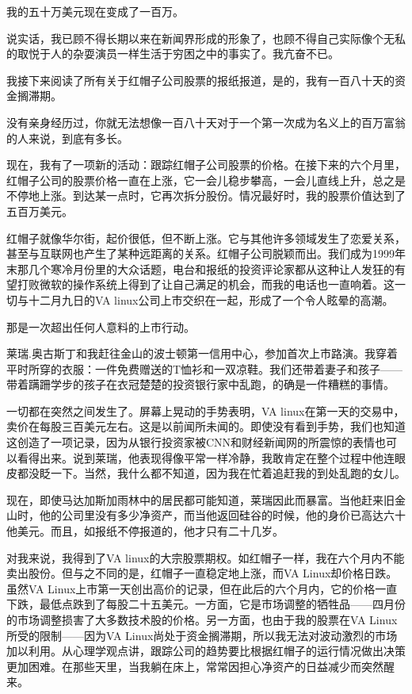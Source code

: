 我的五十万美元现在变成了一百万。

说实话，我已顾不得长期以来在新闻界形成的形象了，也顾不得自己实际像个无私的取悦于人的杂耍演员一样生活于穷困之中的事实了。我亢奋不已。

我接下来阅读了所有关于红帽子公司股票的报纸报道，是的，我有一百八十天的资金搁滞期。

没有亲身经历过，你就无法想像一百八十天对于一个第一次成为名义上的百万富翁的人来说，到底有多长。

现在，我有了一项新的活动：跟踪红帽子公司股票的价格。在接下来的六个月里，红帽子公司的股票价格一直在上涨，它一会儿稳步攀高，一会儿直线上升，总之是不停地上涨。到达某一点时，它再次拆分股份。情况最好时，我的股票价值达到了五百万美元。

红帽子就像华尔街，起价很低，但不断上涨。它与其他许多领域发生了恋爱关系，甚至与互联网也产生了某种远距离的关系。红帽子公司脱颖而出。我们成为1999年末那几个寒冷月份里的大众话题，电台和报纸的投资评论家都从这种让人发狂的有望打败微软的操作系统上得到了让自己满足的机会，而我的电话也一直响着。这一切与十二月九日的VA linux公司上市交织在一起，形成了一个令人眩晕的高潮。

那是一次超出任何人意料的上市行动。

莱瑞.奥古斯丁和我赶往金山的波士顿第一信用中心，参加首次上市路演。我穿着平时所穿的衣服：一件免费赠送的T恤衫和一双凉鞋。我们还带着妻子和孩子——带着蹒跚学步的孩子在衣冠楚楚的投资银行家中乱跑，的确是一件糟糕的事情。

一切都在突然之间发生了。屏幕上晃动的手势表明，VA linux在第一天的交易中，卖价在每股三百美元左右。这是以前闻所未闻的。即使没有看到手势，我们也知道这创造了一项记录，因为从银行投资家被CNN和财经新闻网的所震惊的表情也可以看得出来。说到莱瑞，他表现得像平常一样冷静，我敢肯定在整个过程中他连眼皮都没眨一下。当然，我什么都不知道，因为我在忙着追赶我的到处乱跑的女儿。

现在，即使马达加斯加雨林中的居民都可能知道，莱瑞因此而暴富。当他赶来旧金山时，他的公司里没有多少净资产，而当他返回硅谷的时候，他的身价已高达六十他美元。而且，如报纸不停报道的，他才只有二十几岁。

对我来说，我得到了VA linux的大宗股票期权。如红帽子一样，我在六个月内不能卖出股份。但与之不同的是，红帽子一直稳定地上涨，而VA Linux却价格日跌。虽然VA Linux上市第一天创出高价的记录，但在此后的六个月内，它的价格一直下跌，最低点跌到了每股二十五美元。一方面，它是市场调整的牺牲品——四月份的市场调整损害了大多数技术股的价格。另一方面，也由于我的股票在VA Linux所受的限制——因为VA Linux尚处于资金搁滞期，所以我无法对波动激烈的市场加以利用。从心理学观点讲，跟踪公司的趋势要比根据红帽子的运行情况做出决策更加困难。在那些天里，当我躺在床上，常常因担心净资产的日益减少而突然醒来。

